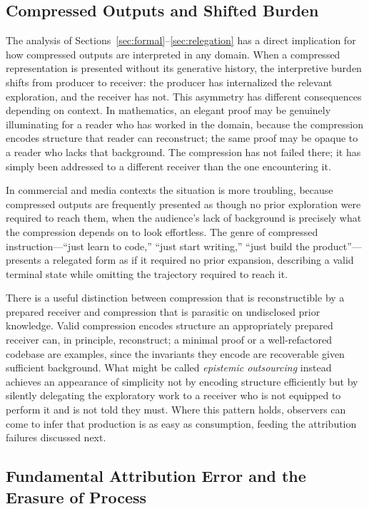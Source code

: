 \documentclass[12pt, a4paper]{article}
\theoremstyle{plain}
\theoremstyle{definition}
\theoremstyle{remark}
\begin{document}
\subsection{Compressed Outputs and Shifted Burden}

The analysis of Sections~\ref{sec:formal}--\ref{sec:relegation} has a direct implication for how compressed outputs are interpreted in any domain. When a compressed representation is presented without its generative history, the interpretive burden shifts from producer to receiver: the producer has internalized the relevant exploration, and the receiver has not. This asymmetry has different consequences depending on context. In mathematics, an elegant proof may be genuinely illuminating for a reader who has worked in the domain, because the compression encodes structure that reader can reconstruct; the same proof may be opaque to a reader who lacks that background. The compression has not failed there; it has simply been addressed to a different receiver than the one encountering it.

In commercial and media contexts the situation is more troubling, because compressed outputs are frequently presented as though no prior exploration were required to reach them, when the audience's lack of background is precisely what the compression depends on to look effortless. The genre of compressed instruction---``just learn to code,'' ``just start writing,'' ``just build the product''---presents a relegated form as if it required no prior expansion, describing a valid terminal state while omitting the trajectory required to reach it.

There is a useful distinction between compression that is reconstructible by a prepared receiver and compression that is parasitic on undisclosed prior knowledge. Valid compression encodes structure an appropriately prepared receiver can, in principle, reconstruct; a minimal proof or a well-refactored codebase are examples, since the invariants they encode are recoverable given sufficient background. What might be called \emph{epistemic outsourcing} instead achieves an appearance of simplicity not by encoding structure efficiently but by silently delegating the exploratory work to a receiver who is not equipped to perform it and is not told they must. Where this pattern holds, observers can come to infer that production is as easy as consumption, feeding the attribution failures discussed next.

\subsection{Fundamental Attribution Error and the Erasure of Process}
\end{document}
